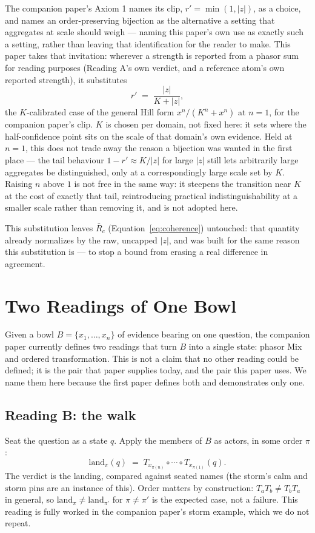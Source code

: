 \documentclass[12pt, a4paper]{article}
\begin{document}
The companion paper's Axiom 1 names its clip, $r'=\min(1,|z|)$, as a
choice, and names an order-preserving bijection as the alternative a
setting that aggregates at scale should weigh --- naming this paper's
own use as exactly such a setting, rather than leaving that
identification for the reader to make. This paper takes that
invitation: wherever a strength is reported from a phasor sum for
reading purposes (Reading A's own verdict, and a reference atom's own
reported strength), it substitutes
\begin{equation}
    r' \;=\; \frac{|z|}{K+|z|},
    \label{eq:bijection}
\end{equation}
the $K$-calibrated case of the general Hill form $x^n/(K^n+x^n)$ at
$n=1$, for the companion paper's clip. $K$ is chosen per domain, not
fixed here: it sets where the half-confidence point sits on the scale
of that domain's own evidence. Held at $n=1$, this does not trade away
the reason a bijection was wanted in the first place --- the tail
behaviour $1-r'\approx K/|z|$ for large $|z|$ still lets arbitrarily
large aggregates be distinguished, only at a correspondingly large
scale set by $K$. Raising $n$ above $1$ is not free in the same way:
it steepens the transition near $K$ at the cost of exactly that tail,
reintroducing practical indistinguishability at a smaller scale rather
than removing it, and is not adopted here.

This substitution leaves $\bar R_c$ (Equation~\eqref{eq:coherence})
untouched: that quantity already normalizes by the raw, uncapped
$|z|$, and was built for the same reason this substitution is --- to
stop a bound from erasing a real difference in agreement.

\section{Two Readings of One Bowl}
\label{sec:two_readings}

Given a bowl $B=\{x_1,\ldots,x_n\}$ of evidence bearing on one
question, the companion paper currently defines two readings that turn
$B$ into a single state: phasor Mix and ordered transformation. This is
not a claim that no other reading could be defined; it is the pair
that paper supplies today, and the pair this paper uses. We name them
here because the first paper defines both and demonstrates only one.

\subsection{Reading B: the walk}
\label{subsec:reading_b}
Seat the question as a state $q$. Apply the members of $B$ as actors,
in some order $\pi$:
\[
    \mathrm{land}_\pi(q) \;=\; T_{x_{\pi(n)}}\circ\cdots\circ
    T_{x_{\pi(1)}}(q).
\]
The verdict is the landing, compared against seated names (the storm's
$\mathrm{calm}$ and $\mathrm{storm}$ pins are an instance of this).
Order matters by construction: $T_a T_b\neq T_b T_a$ in general, so
$\mathrm{land}_\pi \neq \mathrm{land}_{\pi'}$ for $\pi\neq\pi'$ is the
expected case, not a failure. This reading is fully worked in the
companion paper's storm example, which we do not repeat.
\end{document}
